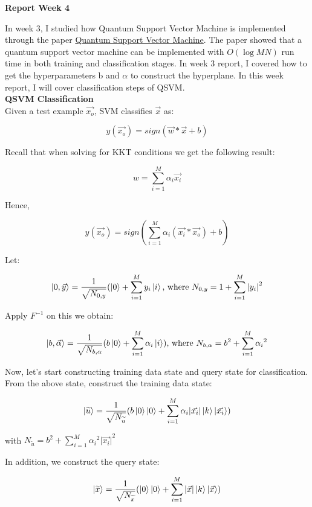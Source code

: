 \documentclass[11pt]{article}
\begin{document}
\begin{center}
\textbf{\Large Report Week 4}
\end{center}

In week 3, I studied how Quantum Support Vector Machine is implemented through the paper \href{https://arxiv.org/abs/1307.0471?context=cs}{Quantum Support Vector Machine}.  The paper showed that a quantum support vector machine can be implemented with $O(\log MN)$ run time in both training and classification stages.  In week 3 report, I covered how to get the hyperparameters b and $\alpha$ to construct the hyperplane. In this week report, I will cover classification steps of QSVM. \\

\textbf{\large QSVM Classification} \\

Given a test example $\vec{x_{o}}$, SVM classifies $\vec{x}$ as:

$$y(\vec{x_{o}}) = sign(\vec{w} * \vec{x} + b)$$

Recall that when solving for KKT conditions we get the following result:

$$w = \sum_{i=1}^{M} \alpha_{i} \vec{x_{i}}$$

Hence, 

$$y(\vec{x_{o}}) = sign(\sum_{i= 1}^{M} \alpha_{i} (\vec{x_{i}} * \vec{x_{o}}) + b)$$

Let: 

$$\ket{0, \vec{y}} = \frac{1}{\sqrt{N_{0,y}}} (\ket{0} + \sum_{i=1}^{M} y_{i} \ket{i} \text{, where } N_{0,y} = 1 + \sum_{i=1}^{M} {\vert y_{i} \vert}^{2}$$

Apply $F^{-1}$ on this we obtain: 

$$\ket{b, \vec{\alpha}} = \frac{1}{\sqrt{N_{b,\alpha}}} (b\ket{0} + \sum_{i=1}^{M} {\alpha}_{i} \ket{i}) \text{, where } N_{b, \alpha} = b^{2} + \sum_{i = 1}^{M} {\alpha_{i}}^{2}$$

Now, let's start constructing training data state and query state for classification. From the above state, construct the training data state:

$$\ket{\widetilde{u}} = \frac{1}{\sqrt{N_{\widetilde{u}}}} (b \ket{0} \ket{0} + \sum_{i=1}^{M} \alpha_{i} \vert \vec{x_{i}} \vert \ket{k} \ket{\vec{x_{i}}})$$

with $N_{\widetilde{u}} = b^{2} + \sum_{i=1}^{M} {\alpha_{i}}^{2} {\vert \vec{x_{i}} \vert}^{2}$

In addition, we construct the query state: 

$$\ket{\widetilde{x}} = \frac{1}{\sqrt{N_{\widetilde{x}}}} (\ket{0} \ket{0} + \sum_{i=1}^{M} \vert \vec{x} \vert \ket{k} \ket{\vec{x}})$$
\end{document}
